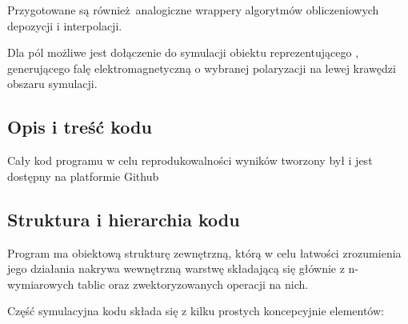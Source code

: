 Przygotowane są również analogiczne wrappery %
algorytmów obliczeniowych depozycji i interpolacji.

Dla pól możliwe jest dołączenie do symulacji obiektu reprezentującego , 
generującego falę elektromagnetyczną o wybranej polaryzacji na lewej krawędzi obszaru symulacji.

\subsection{Opis i treść kodu}
Cały kod programu w celu reprodukowalności wyników tworzony był i jest
dostępny na platformie Github 

\subsection{Struktura i hierarchia kodu}

Program ma obiektową strukturę zewnętrzną, którą w celu łatwości
zrozumienia jego działania nakrywa wewnętrzną warstwę składającą się
głównie z n-wymiarowych tablic  oraz zwektoryzowanych
operacji na nich.

Część symulacyjna kodu składa się z kilku prostych koncepcyjnie elementów:

